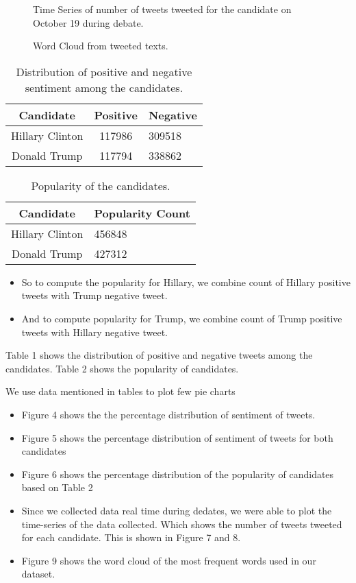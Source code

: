 \documentclass{acm_proc_article-sp}
\begin{document}
\begin{figure*}
	\centering
	\caption{Time Series of number of tweets tweeted for the candidate on October 19 during debate.}
\end{figure*}

\begin{figure}
	\centering
	\caption{Word Cloud from tweeted texts.}
\end{figure}

\begin{table}
	\centering
	\caption{Distribution of positive and negative sentiment among the candidates.}
	\begin{tabular}{|c|c|l|} \hline
		Candidate&Positive&Negative\\ \hline
		Hillary Clinton & 117986 & 309518\\ \hline
		Donald Trump & 117794 & 338862\\ \hline
	\end{tabular}
\end{table}

\begin{table}
	\centering
	\caption{Popularity of the candidates.}
	\begin{tabular}{|c|l|} \hline
		Candidate&Popularity Count\\ \hline
		Hillary Clinton & 456848\\ \hline
		Donald Trump & 427312\\ \hline
	\end{tabular}
\end{table}

\begin{itemize}
	\item So to compute the popularity for Hillary, we combine count of Hillary positive tweets with Trump negative tweet.
	\item And to compute popularity for Trump, we combine count of Trump positive tweets with Hillary negative tweet.
\end{itemize}
Table 1 shows the distribution of positive and negative tweets among the candidates.
Table 2 shows the popularity of candidates.

We use data mentioned in tables to plot few pie charts
\begin{itemize}
	\item Figure 4 shows the the percentage distribution of sentiment of tweets.
	\item Figure 5 shows the percentage distribution of sentiment of tweets for both candidates
	\item Figure 6 shows the percentage distribution of the popularity of candidates based on Table 2
	\item Since we collected data real time during dedates, we were able to plot the time-series of the data collected. Which shows the number of tweets tweeted for each candidate. This is shown in Figure 7 and 8.
	\item Figure 9 shows the word cloud of the most frequent words used in our dataset.
\end{itemize}
\end{document}
